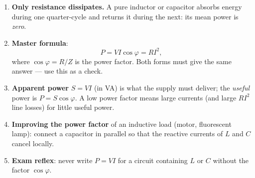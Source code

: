 \documentclass[11pt]{article}
\newcommand{\cle}[1]{{\popxbold\color{popdark}#1}}
\begin{document}
\begin{methode}
\begin{enumerate}
\item \textbf{Only resistance dissipates.} A pure inductor or capacitor absorbs energy during one quarter-cycle and returns it during the next: its mean power is \emph{zero}.
\item \textbf{Master formula}:
\[
P = VI\cos\varphi = RI^2,
\]
where $\cos\varphi = R/Z$ is the \cle{power factor}. Both forms must give the same answer --- use this as a check.
\item \textbf{Apparent power} $S = VI$ (in VA) is what the supply must deliver; the \emph{useful} power is $P = S\cos\varphi$. A low power factor means large currents (and large $RI^2$ line losses) for little useful power.
\item \textbf{Improving the power factor} of an inductive load (motor, fluorescent lamp): connect a capacitor in parallel so that the reactive currents of $L$ and $C$ cancel locally.
\item \textbf{Exam reflex}: never write $P = VI$ for a circuit containing $L$ or $C$ without the factor $\cos\varphi$.
\end{enumerate}
\end{methode}
\end{document}
